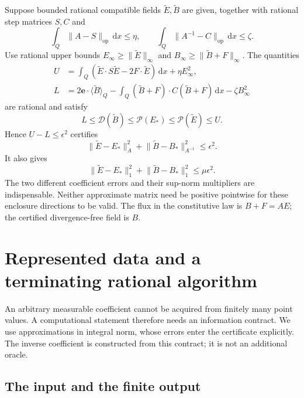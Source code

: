 \documentclass[11pt,a4paper]{article}
\numberwithin{equation}{section}
\theoremstyle{definition}
\theoremstyle{remark}\newtheorem{remark}[theorem]{Remark}
\newcommand{\dd}{\,\mathrm dx}
\newcommand{\mean}[2]{\langle #1\rangle_{#2}}
\newcommand{\norm}[1]{\lVert #1\rVert}
\newcommand{\cP}{\mathcal P}
\newcommand{\cD}{\mathcal D}
\newcommand{\op}{\mathrm{op}}
\newcommand{\evec}{\boldsymbol e}
\begin{document}
Suppose bounded rational compatible fields \(\widetilde E,\widetilde B\)
are given, together with rational step matrices \(S,C\) and
\[
 \int_Q\norm{A-S}_{\op}\dd\leq\eta,\qquad
 \int_Q\norm{A^{-1}-C}_{\op}\dd\leq\zeta.
\]
Use rational upper bounds \(E_\infty\geq\norm{\widetilde E}_\infty\)
and \(B_\infty\geq\norm{\widetilde B+F}_\infty\).
The quantities
\begin{align}
 U&=\int_Q(\widetilde E\cdot S\widetilde E
                        -2F\cdot\widetilde E)\dd+\eta E_\infty^2,
       \label{eq:rational-U}\\
 L&=2\evec\cdot\mean{\widetilde B}Q
     -\int_Q(\widetilde B+F)\cdot C(\widetilde B+F)\dd
     -\zeta B_\infty^2\label{eq:rational-L}
\end{align}
are rational and satisfy
\[
 L\leq\cD(\widetilde B)\leq\cP(E_*)\leq
       \cP(\widetilde E)\leq U.
\]
Hence \(U-L\leq\epsilon^2\) certifies
\begin{equation}\label{eq:certified-field}
 \norm{\widetilde E-E_*}_A^2+
 \norm{\widetilde B-B_*}_{A^{-1}}^2\leq\epsilon^2.
\end{equation}
It also gives
\[
 \norm{\widetilde E-E_*}_1^2+
 \norm{\widetilde B-B_*}_1^2\leq\mu\epsilon^2.
\]
The two different coefficient errors and their sup-norm multipliers
are indispensable. Neither approximate matrix need be positive
pointwise for these enclosure directions to be valid.
The flux in the constitutive law is \(B+F=AE\); the certified
divergence-free field is \(B\).



\section{Represented data and a terminating rational algorithm}\label{sec:computation}

An arbitrary measurable coefficient cannot be acquired from finitely many
point values. A computational statement therefore needs an information
contract. We use approximations in integral norm, whose errors enter the
certificate explicitly. The inverse coefficient is constructed from this
contract; it is not an additional oracle.

\subsection{The input and the finite output}
\end{document}
